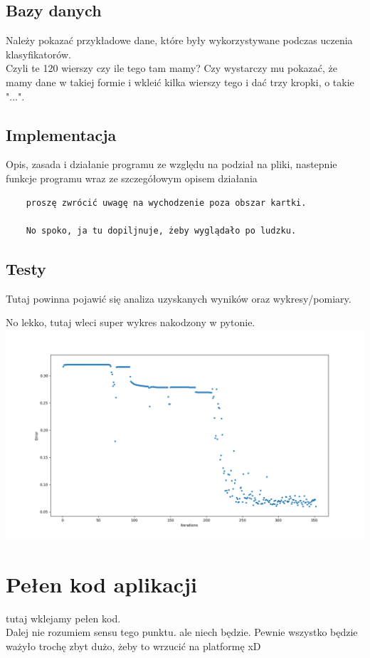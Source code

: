 \documentclass[12pt,a4paper]{article}
\begin{document}
	\subsection*{Bazy danych}
	Należy pokazać przykładowe dane, które były wykorzystywane podczas uczenia klasyfikatorów.
	\\
	Czyli te 120 wierszy czy ile tego tam mamy? Czy wystarczy mu pokazać, że mamy dane w takiej formie i wkleić kilka wierszy tego i dać trzy kropki, o takie "...".
	\subsection*{Implementacja}
	Opis, zasada i działanie programu ze względu na podział na pliki, nastepnie	funkcje programu wraz ze szczegółowym opisem działania
	\begin{verbatim}
	proszę zwrócić uwagę na wychodzenie poza obszar kartki.
	
	No spoko, ja tu dopiljnuje, żeby wyglądało po ludzku.
	\end{verbatim}
	\subsection*{Testy}
	Tutaj powinna pojawić się analiza uzyskanych wyników oraz wykresy/pomiary.
	
	No lekko, tutaj wleci super wykres nakodzony w pytonie. \\
	\includegraphics[scale=0.5]{supa_wykres}
	\newpage
	\section*{Pełen kod aplikacji}
	tutaj wklejamy pełen kod.\\ Dalej nie rozumiem sensu tego punktu. ale niech będzie. Pewnie wszystko będzie ważyło trochę zbyt dużo, żeby to wrzucić na platformę xD
\end{document}
